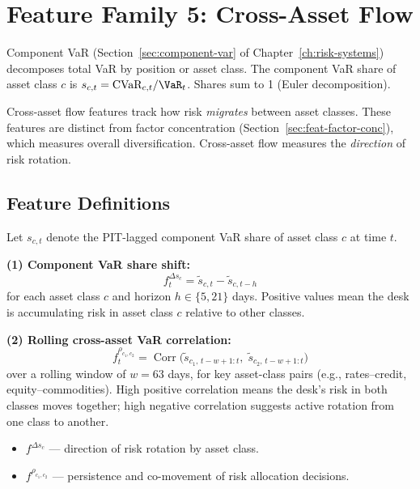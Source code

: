 \section{Feature Family 5: Cross-Asset Flow}
\label{sec:feat-cross-asset}

\begin{prereq}
Component VaR (Section~\ref{sec:component-var} of
Chapter~\ref{ch:risk-systems}) decomposes total VaR by position or
asset class.  The component VaR share of asset class $c$ is
$s_{c,t} = \text{CVaR}_{c,t} / \VaR_t$.  Shares sum to 1 (Euler
decomposition).
\end{prereq}

Cross-asset flow features track how risk \emph{migrates} between asset
classes.  These features are distinct from factor concentration
(Section~\ref{sec:feat-factor-conc}), which measures overall
diversification.  Cross-asset flow measures the \emph{direction} of
risk rotation.

\subsection{Feature Definitions}

Let $s_{c,t}$ denote the PIT-lagged component VaR share of asset class
$c$ at time $t$.

\begin{definition}
\textbf{(1) Component VaR share shift:}
\begin{equation}
\label{eq:share-shift}
f^{\Delta s_c}_t = \tilde{s}_{c,t} - \tilde{s}_{c,t-h}
\end{equation}
for each asset class $c$ and horizon $h \in \{5, 21\}$ days.  Positive
values mean the desk is accumulating risk in asset class $c$ relative
to other classes.

\textbf{(2) Rolling cross-asset VaR correlation:}
\begin{equation}
\label{eq:cross-corr}
f^{\rho_{c_1,c_2}}_t = \operatorname{Corr}\!\bigl(
  \tilde{s}_{c_1,\, t-w+1:t},\; \tilde{s}_{c_2,\, t-w+1:t}
\bigr)
\end{equation}
over a rolling window of $w=63$ days, for key asset-class pairs (e.g.,
rates--credit, equity--commodities).  High positive correlation means
the desk's risk in both classes moves together; high negative
correlation suggests active rotation from one class to another.

\begin{itemize}[nosep]
  \item $f^{\Delta s_c}$ --- direction of risk rotation by asset class.
  \item $f^{\rho_{c_1,c_2}}$ --- persistence and co-movement of risk
        allocation decisions.
\end{itemize}
\end{definition}

